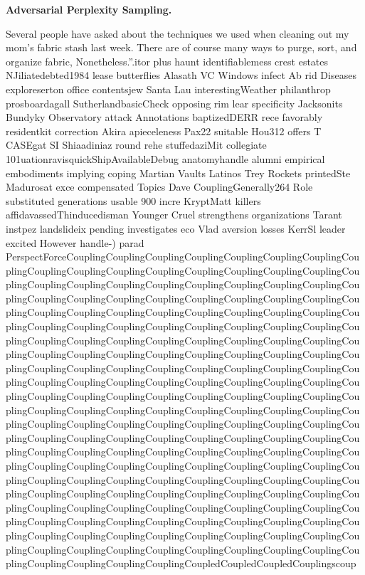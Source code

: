 \documentclass{article}
\newcommand{\myparagraph}[1]{\par\noindent\textbf{{#1}.}} %
\theoremstyle{definition}
\begin{document}
\myparagraph{Adversarial Perplexity Sampling}
\begin{displayquote}
{\small
Several people have asked about the techniques we used when cleaning out my mom's fabric stash last week. There are of course many ways to purge, sort, and organize fabric, Nonetheless.''.itor plus haunt identifiablemess crest estates NJiliatedebted1984 lease butterflies Alasath VC Windows infect Ab rid Diseases exploreserton office contentsjew Santa Lau interestingWeather philanthrop prosboardagall SutherlandbasicCheck opposing rim lear specificity Jacksonits Bundyky Observatory attack Annotations baptizedDERR rece favorably residentkit correction Akira apieceleness Pax22 suitable Hou312 offers T CASEgat SI Shiaadiniaz round rehe stuffedaziMit collegiate 101uationravisquickShipAvailableDebug anatomyhandle alumni empirical embodiments implying coping Martian Vaults Latinos Trey Rockets printedSte Madurosat exce compensated Topics Dave Coupling\-Generally264 Role substituted generations usable 900 incre KryptMatt killers affidavassedThinducedisman Younger Cruel strengthens organizations Tarant instpez landslideix pending investigates eco Vlad aversion losses KerrSl leader excited However handle-) parad 
PerspectForceCoupling\-Coupling\-Coupling\-Coupling\-Coupling\-Coupling\-Coupling\-Coupling\-Coupling\-Coupling\-Coupling\-Coupling\-Coupling\-Coupling\-Coupling\-Coupling\-Coupling\-Coupling\-Coupling\-Coupling\-Coupling\-Coupling\-Coupling\-Coupling\-Coupling\-Coupling\-Coupling\-Coupling\-Coupling\-Coupling\-Coupling\-Coupling\-Coupling\-Coupling\-Coupling\-Coupling\-Coupling\-Coupling\-Coupling\-Coupling\-Coupling\-Coupling\-Coupling\-Coupling\-Coupling\-Coupling\-Coupling\-Coupling\-Coupling\-Coupling\-Coupling\-Coupling\-Coupling\-Coupling\-Coupling\-Coupling\-Coupling\-Coupling\-Coupling\-Coupling\-Coupling\-Coupling\-Coupling\-Coupling\-Coupling\-Coupling\-Coupling\-Coupling\-Coupling\-Coupling\-Coupling\-Coupling\-Coupling\-Coupling\-Coupling\-Coupling\-Coupling\-Coupling\-Coupling\-Coupling\-Coupling\-Coupling\-Coupling\-Coupling\-Coupling\-Coupling\-Coupling\-Coupling\-Coupling\-Coupling\-Coupling\-Coupling\-Coupling\-Coupling\-Coupling\-Coupling\-Coupling\-Coupling\-Coupling\-Coupling\-Coupling\-Coupling\-Coupling\-Coupling\-Coupling\-Coupling\-Coupling\-Coupling\-Coupling\-Coupling\-Coupling\-Coupling\-Coupling\-Coupling\-Coupling\-Coupling\-Coupling\-Coupling\-Coupling\-Coupling\-Coupling\-Coupling\-Coupling\-Coupling\-Coupling\-Coupling\-Coupling\-Coupling\-Coupling\-Coupling\-Coupling\-Coupling\-Coupling\-Coupling\-Coupling\-Coupling\-Coupling\-Coupling\-Coupling\-Coupling\-Coupling\-Coupling\-Coupling\-Coupling\-Coupling\-Coupling\-Coupling\-Coupling\-Coupling\-Coupling\-Coupling\-Coupling\-Coupling\-Coupling\-Coupling\-Coupling\-Coupling\-Coupling\-Coupling\-Coupling\-Coupling\-Coupling\-Coupling\-Coupling\-Coupling\-Coupling\-Coupling\-Coupling\-Coupling\-Coupling\-Coupling\-Coupling\-Coupling\-Coupling\-Coupling\-Coupling\-Coupling\-Coupling\-Coupling\-Coupling\-Coupling\-Coupling\-Coupling\-Coupling\-Coupling\-Coupling\-Coupling\-Coupling\-Coupling\-Coupling\-Coupling\-Coupling\-Coupling\-Coupling\-Coupling\-Coupling\-Coupling\-Coupling\-Coupling\-Coupling\-Coupling\-Coupled\-Coupled\-Coupled\-Coupling\-scoup 
}
\end{displayquote}
\end{document}
